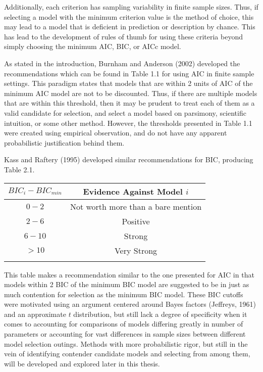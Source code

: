 		Additionally, each criterion has sampling variability in finite sample sizes. Thus, if selecting a model with the minimum criterion value is the method of choice, this may lead to a model that is
		deficient in prediction or description by chance. This has lead to the development of rules of thumb for using these criteria beyond simply choosing the minimum AIC, BIC, or AICc model.

		As stated in the introduction, Burnham and Anderson (2002) developed the recommendations which can be found in Table 1.1 for using AIC in finite sample settings. This paradigm states that models
		that are within 2 units of AIC of the minimum AIC model are not to be discounted. Thus, if there are multiple models that are within this threshold, then it may be prudent to treat each of them
		as a valid candidate for selection, and select a model based on parsimony, scientific intuition, or some other method. However, the thresholds presented in Table 1.1 were created using empirical
		observation, and do not have any apparent probabilistic justification behind them.

		Kass and Raftery (1995) developed similar recommendations for BIC, producing Table 2.1.
		\begin{table}[H]
		\centering
		{
		\begin{tabular}{ c|c}
		$BIC_{i}-BIC_{min}$ & Evidence Against Model $i$\\
		 \hline
		 $0 - 2$ & Not worth more than a bare mention\\
		 $2 - 6$ & Positive\\
		 $6 - 10$ & Strong\\
		 $> 10$ & Very Strong\\
		 \Xhline{3\arrayrulewidth}
		\end{tabular}
		}
		\end{table}
		This table makes a recommendation similar to the one presented for AIC in that models within 2 BIC of the minimum BIC model are suggested to be in just as much contention for selection as
		the minimum BIC model. These BIC cutoffs were motivated using an argument centered around Bayes factors (Jeffreys, 1961) and an approximate $t$ distribution, but still lack a degree of specificity
		when it comes to accounting for comparisons of models differing greatly in number of parameters or accounting for vast differences in sample sizes between different model selection outings.
		Methods with more probabilistic rigor, but still in the vein of identifying contender candidate models and selecting from among them, will be developed and explored later in this thesis.

